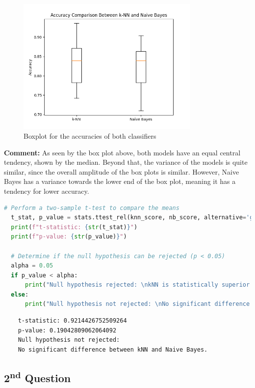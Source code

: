 \documentclass{article}
\begin{document}
  \begin{figure}[H]
    \centering
    \includegraphics[width=0.8\textwidth]{images/boxplot.png}
    \caption{Boxplot for the accuracies of both classifiers}
    \label{fig:boxplot}
  \end{figure}

  \textbf{Comment:}
  As seen by the box plot above, both models have an equal central tendency, shown by the median. Beyond that, the variance of the models is quite similar, since the overall amplitude of the box plots is similar. However, Naive Bayes has a variance towards the lower end of the box plot, meaning it has a tendency for lower accuracy.

  \begin{lstlisting}[language=Python]
    # Perform a two-sample t-test to compare the means
  t_stat, p_value = stats.ttest_rel(knn_score, nb_score, alternative='greater')
  print(f"t-statistic: {str(t_stat)}")
  print(f"p-value: {str(p_value)}")

  # Determine if the null hypothesis can be rejected (p < 0.05)
  alpha = 0.05
  if p_value < alpha:
      print("Null hypothesis rejected: \nkNN is statistically superior to Naive Bayes.")
  else:
      print("Null hypothesis not rejected: \nNo significant difference between kNN and Naive Bayes.")
  \end{lstlisting}

  \begin{lstlisting}
    t-statistic: 0.9214426752509264
    p-value: 0.19042809062064092
    Null hypothesis not rejected: 
    No significant difference between kNN and Naive Bayes.
  \end{lstlisting}




\subsection*{2\textsuperscript{nd} Question}
\end{document}
